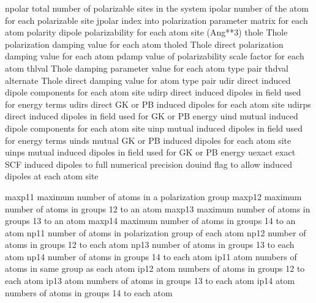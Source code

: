 \documentclass[letterpaper,11pt,english]{sphinxmanual}
\begin{document}
\begin{sphinxVerbatim}[commandchars=\\\{\}]
npolar          total number of polarizable sites in the system
ipolar          number of the atom for each polarizable site
jpolar          index into polarization parameter matrix for each atom
polarity        dipole polarizability for each atom site (Ang**3)
thole           Thole polarization damping value for each atom
tholed          Thole direct polarization damping value for each atom
pdamp           value of polarizability scale factor for each atom
thlval          Thole damping parameter value for each atom type pair
thdval          alternate Thole direct damping value for atom type pair
udir            direct induced dipole components for each atom site
udirp           direct induced dipoles in field used for energy terms
udirs           direct GK or PB induced dipoles for each atom site
udirps          direct induced dipoles in field used for GK or PB energy
uind            mutual induced dipole components for each atom site
uinp            mutual induced dipoles in field used for energy terms
uinds           mutual GK or PB induced dipoles for each atom site
uinps           mutual induced dipoles in field used for GK or PB energy
uexact          exact SCF induced dipoles to full numerical precision
douind          flag to allow induced dipoles at each atom site
\end{sphinxVerbatim}

\sphinxAtStartPar
{}

\begin{sphinxVerbatim}[commandchars=\\\{\}]
maxp11          maximum number of atoms in a polarization group
maxp12          maximum number of atoms in groups 1\PYGZhy{}2 to an atom
maxp13          maximum number of atoms in groups 1\PYGZhy{}3 to an atom
maxp14          maximum number of atoms in groups 1\PYGZhy{}4 to an atom
np11            number of atoms in polarization group of each atom
np12            number of atoms in groups 1\PYGZhy{}2 to each atom
np13            number of atoms in groups 1\PYGZhy{}3 to each atom
np14            number of atoms in groups 1\PYGZhy{}4 to each atom
ip11            atom numbers of atoms in same group as each atom
ip12            atom numbers of atoms in groups 1\PYGZhy{}2 to each atom
ip13            atom numbers of atoms in groups 1\PYGZhy{}3 to each atom
ip14            atom numbers of atoms in groups 1\PYGZhy{}4 to each atom
\end{sphinxVerbatim}
\end{document}
